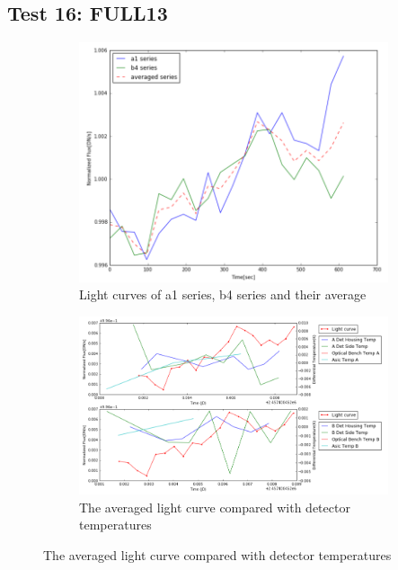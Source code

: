 \documentclass[conference]{IEEEtran}
\begin{document}
\subsection{Test 16: FULL13} 
\begin{figure}[H]
    \centering
    \begin{subfigure}{1}
        \includegraphics[scale=0.4]{ts_test16}
        \caption{Light curves of a1 series, b4 series and their average}
    \end{subfigure}

    \begin{subfigure}{2}
        \includegraphics[scale=0.4]{temp_test16}
        \caption{The averaged light curve compared with detector temperatures}
    \end{subfigure}
   

\end{figure}
\end{document}
